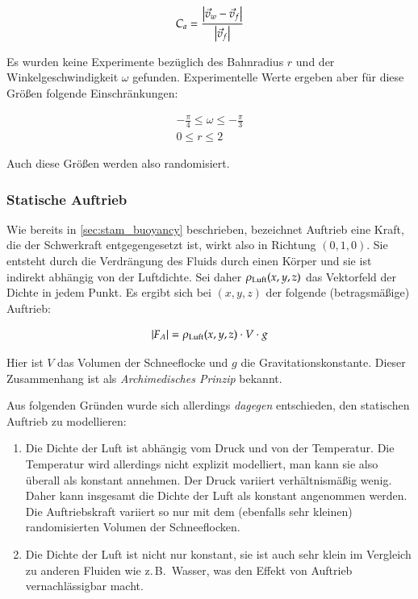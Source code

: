\begin{equation}
C_a =
\frac
{
  \left|\vec{v}_w - \vec{v}_f\right|
}
{
  \left|\vec{v}_f\right|
}
\end{equation}

Es wurden keine Experimente bezüglich des Bahnradius $r$ und der
Winkelgeschwindigkeit $\omega$ gefunden. Experimentelle Werte ergeben
aber für diese Größen folgende Einschränkungen:

\begin{gather}
-\frac{\pi}{4} \leq \omega \leq -\frac{\pi}{3} \\
0 \leq r \leq 2
\end{gather}

Auch diese Größen werden also randomisiert.

\subsubsection{Statische Auftrieb}

Wie bereits in \autoref{sec:stam_buoyancy} beschrieben, bezeichnet
Auftrieb eine Kraft, die der Schwerkraft entgegengesetzt ist, wirkt
also in Richtung $(0,1,0)$. Sie entsteht durch die Verdrängung des
Fluids durch einen Körper und sie ist indirekt abhängig von der
Luftdichte. Sei daher $\rho_{\textnormal{Luft}}(x,y,z)$ das
Vektorfeld der Dichte in jedem Punkt. Es ergibt sich bei $(x,y,z)$ der
folgende (betragsmäßige) Auftrieb:

\begin{equation}
|F_A| = \rho_{\textnormal{Luft}}(x,y,z) \cdot V \cdot g
\end{equation}

Hier ist $V$ das Volumen der Schneeflocke und $g$ die
Gravitationskonstante. Dieser Zusammenhang ist als
\emph{Archimedisches Prinzip} bekannt.

Aus folgenden Gründen wurde sich allerdings \emph{dagegen}
entschieden, den statischen Auftrieb zu modellieren:

\begin{enumerate}
\item Die Dichte der Luft ist abhängig vom Druck und von der
Temperatur. Die Temperatur wird allerdings nicht explizit
modelliert, man kann sie also überall als konstant annehmen. Der Druck
variiert verhältnismäßig wenig. Daher kann insgesamt die Dichte der
Luft als konstant angenommen werden. Die Auftriebskraft variiert so
nur mit dem (ebenfalls sehr kleinen) randomisierten Volumen der
Schneeflocken.
\item Die Dichte der Luft ist nicht nur konstant, sie ist auch sehr
klein im Vergleich zu anderen Fluiden wie z.\,B.\ Wasser, was den
Effekt von Auftrieb vernachlässigbar macht.
\end{enumerate}

